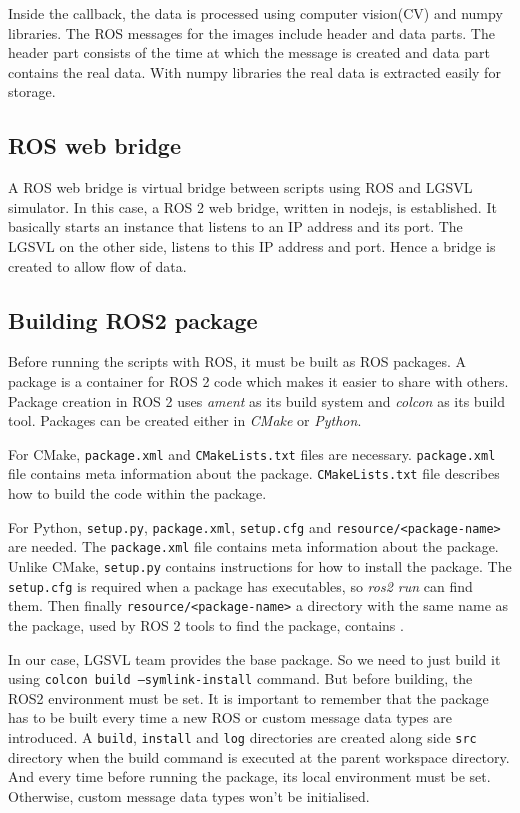 Inside the callback, the data is processed using computer vision(CV) and numpy libraries.
The ROS messages for the images include header and data
parts. The header part consists of the time at which the message is created and data part
contains the real data. With numpy libraries the real data is extracted easily for storage.

\subsection{ROS web bridge}
A ROS web bridge is virtual bridge between scripts using ROS and LGSVL simulator. In this
case, a ROS 2 web bridge, written in nodejs, is established. It basically starts an instance
that listens to an IP address and its port. The LGSVL on the other side, listens to this
IP address and port. Hence a bridge is created to allow flow of data.

\subsection{Building ROS2 package}
Before running the scripts with ROS, it must be built as ROS packages.  A package is a
container for ROS 2 code which makes it easier to share with others. Package creation in
ROS 2 uses \textit{ament} as its build system and \textit{colcon} as its build tool.
Packages can be created either in \textit{CMake} or \textit{Python}.

For CMake, \texttt{package.xml} and \texttt{CMakeLists.txt} files are necessary. \texttt{package.xml}
file contains meta information about the package. \texttt{CMakeLists.txt} file describes how to build the code within the package.

For Python, \texttt{setup.py}, \texttt{package.xml}, \texttt{setup.cfg} and
\texttt{resource/<package-name>} are needed. The \texttt{package.xml} file contains meta
information about the package. Unlike CMake, \texttt{setup.py} contains instructions for
how to install the package. The \texttt{setup.cfg} is required when a package has
executables, so \textit{ros2 run} can find them. Then finally \texttt{resource/<package-name>} a
directory with the same name as the package, used by ROS 2 tools to find the package,
contains \texttt{}.

In our case, LGSVL team provides the base package. So we need to just build it using
\texttt{colcon build --symlink-install} command. But before building, the ROS2 environment
 must be set. It is important to remember that the package has
to be built every time a new ROS or custom message data types are introduced. A \texttt{build},
\texttt{install} and \texttt{log} directories are created along side \texttt{src}
directory when the build command is executed at the parent workspace directory. And
every time before running the package, its local environment must be set. Otherwise,
custom message data types won't be initialised.

